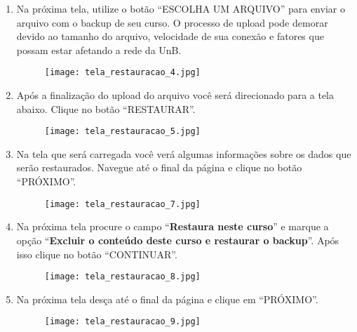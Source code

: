 \documentclass[12pt]{report}
\begin{document}
\begin{enumerate}[\bf 1)]
  	\newpage


	\item Na pr\'oxima tela, utilize o bot\~ao ``ESCOLHA UM ARQUIVO'' para enviar o arquivo com o backup de seu curso. O processo de upload pode demorar devido ao tamanho do arquivo, velocidade de sua conex\~ao e fatores que possam estar afetando a rede da UnB.
	\begin{figure}[H]
    	\centering
    	\hspace*{-2.5cm}\texttt{[image: tela\_restauracao\_4.jpg]}
  	\end{figure}

  	\newpage

	\item Ap\'os a finaliza\c{c}\~ao do upload do arquivo voc\^e ser\'a direcionado para a tela abaixo. Clique no bot\~ao ``RESTAURAR''.
	\begin{figure}[H]
    	\centering
    	\hspace*{-2.5cm}\texttt{[image: tela\_restauracao\_5.jpg]}
  	\end{figure}

	\newpage

	\item  Na tela que ser\'a carregada voc\^e ver\'a algumas informa\c{c}\~oes sobre os dados que ser\~ao restaurados. Navegue at\'e o final da p\'agina e clique no bot\~ao ``PR\'OXIMO''.
	\begin{figure}[H]
    	\centering
    	\hspace*{-2.5cm}\texttt{[image: tela\_restauracao\_7.jpg]}
  	\end{figure}

  	\newpage

	\item Na pr\'oxima tela procure o campo ``\textbf{Restaura neste curso}'' e marque a op\c{c}\~ao ``\textbf{Excluir o conte\'udo deste curso e restaurar o backup}''. Ap\'os isso clique no bot\~ao ``CONTINUAR''.
	\begin{figure}[H]
    	\centering
    	\hspace*{-2.5cm}\texttt{[image: tela\_restauracao\_8.jpg]}
  	\end{figure}

	\newpage

	\item Na pr\'oxima tela des\c{c}a at\'e o final da p\'agina e clique em ``PR\'OXIMO''.
	\begin{figure}[H]
    	\centering
    	\hspace*{-2.5cm}\texttt{[image: tela\_restauracao\_9.jpg]}
  	\end{figure}


\end{enumerate}
\end{document}
